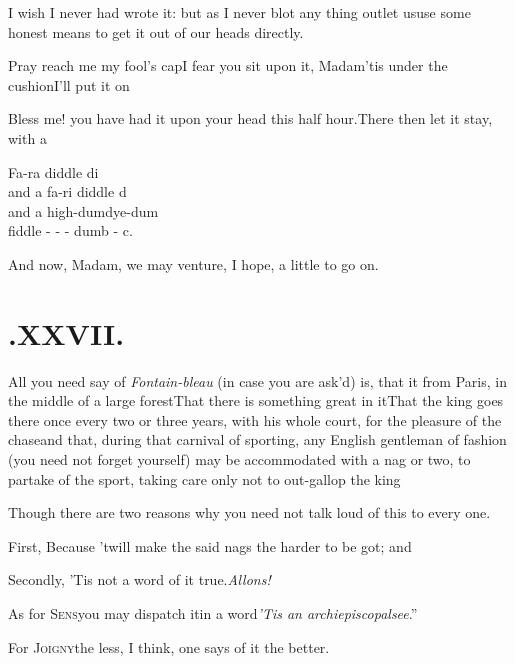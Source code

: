 \documentclass{article}
\begin{document}
\tsh I wish I never had wrote it: but as I never blot
any thing out\tsh let us\pb use some honest means to get it
out of our heads directly.

\tsh Pray reach me my fool’s cap\tsh I
fear you sit upon it, Madam\tsh ’tis under the
cushion\tsh I’ll put it on\tsh

Bless me! you have had it upon your head this half
hour.\tsh There then let it stay, with a

Fa-ra diddle di\\\indent
and a fa-ri diddle d\\\indent
and a high-dum\tsk dye-dum\\\indent
\quad fiddle - - - dumb - c.

\noindent
And now, Madam, we may venture, I hope, a little to go on.

\newpage\null
\section{.\enspace XXVII.}

\quad\tsh All you need say of \textit{Fontain-\break bleau} (in case you are ask’d)
is, that it\break{}\break
from Paris, in the middle of
a large forest\tsh That there is something great in it\tsh That the king goes
there once every two or three years, with his whole court, for the pleasure of the
chase\tsk and that, during that carnival of sporting, any English gentleman of fashion
(you need not forget yourself) may be accommodated with a nag or two, to partake of
the sport, taking care only not to out-gallop the king\tsh

Though there are two reasons why you need not talk loud of this
to every one.

\newpage
First, Because ’twill make the said nags the harder to be
got; and

Secondly, ’Tis not a word of it
true.\break\tsh \textit{Allons!}

As for \textsc{Sens}\tsh you may
dispatch it\break in a word\tsh \lqq\textit{’Tis an
archiepiscopal\break see}.”

\tsh For \textsc{Joigny}\tsk the less, I think,\break
one says of it the better.
\end{document}
